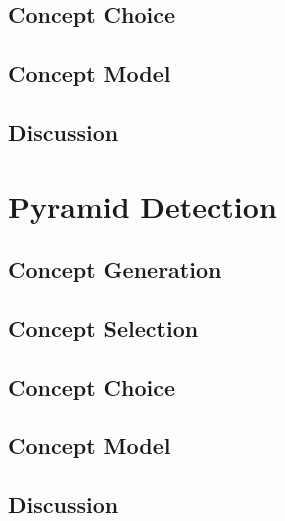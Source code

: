 \documentclass[12pt]{article}
\begin{document}
\subsection{Concept Choice}
\subsection{Concept Model}
\subsection{Discussion}

\section{Pyramid Detection}
\subsection{Concept Generation}
\subsection{Concept Selection}
\subsection{Concept Choice}
\subsection{Concept Model}
\subsection{Discussion}
\end{document}

